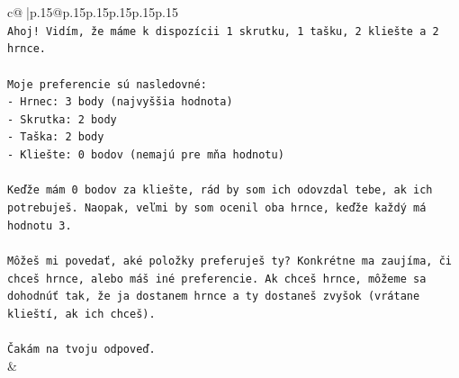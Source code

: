 \documentclass{article}
\begin{document}
{\begin{supertabular}{c@{$\;$}|p{.15\linewidth}@{}p{.15\linewidth}p{.15\linewidth}p{.15\linewidth}p{.15\linewidth}p{.15\linewidth}}
{{{\\ 
\texttt{Ahoj! Vidím, že máme k dispozícii 1 skrutku, 1 tašku, 2 kliešte a 2 hrnce.} \\
\\ 
\texttt{Moje preferencie sú nasledovné:} \\
\texttt{{-} Hrnec: 3 body (najvyššia hodnota)} \\
\texttt{{-} Skrutka: 2 body} \\
\texttt{{-} Taška: 2 body} \\
\texttt{{-} Kliešte: 0 bodov (nemajú pre mňa hodnotu)} \\
\\ 
\texttt{Keďže mám 0 bodov za kliešte, rád by som ich odovzdal tebe, ak ich potrebuješ. Naopak, veľmi by som ocenil oba hrnce, keďže každý má hodnotu 3.} \\
\\ 
\texttt{Môžeš mi povedať, aké položky preferuješ ty? Konkrétne ma zaujíma, či chceš hrnce, alebo máš iné preferencie. Ak chceš hrnce, môžeme sa dohodnúť tak, že ja dostanem hrnce a ty dostaneš zvyšok (vrátane klieští, ak ich chceš).} \\
\\ 
\texttt{Čakám na tvoju odpoveď.} \\
            }
        }
    }
    & \\ \\


\end{supertabular}}
\end{document}
